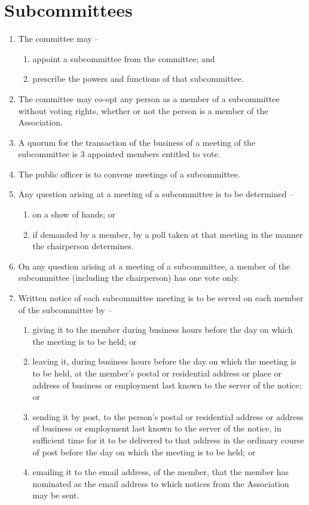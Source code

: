 \section{Subcommittees}
\label{rule:subcommittee}

\begin{enumerate}
	\item The committee may --
	\begin{enumerate}
		\item appoint a subcommittee from the committee; and
		\item prescribe the powers and functions of that subcommittee.
	\end{enumerate}
	
	\item The committee may co-opt any person as a member of a subcommittee without voting rights, whether or not the person is a member of the Association.
	\item A quorum for the transaction of the business of a meeting of the subcommittee is 3 appointed members entitled to vote.
	\item The public officer is to convene meetings of a subcommittee.
	
	\item Any question arising at a meeting of a subcommittee is to be determined --
	\begin{enumerate}
		\item on a show of hands; or
		\item if demanded by a member, by a poll taken at that meeting in the manner the chairperson determines.
	\end{enumerate}
	
	\item On any question arising at a meeting of a subcommittee, a member of the subcommittee (including the chairperson) has one vote only.
	
	\item Written notice of each subcommittee meeting is to be served on each member of the subcommittee by --
	\begin{enumerate}
		\item giving it to the member during business hours before the day on which the meeting is to be held; or
		\item leaving it, during business hours before the day on which the meeting is to be held, at the member's postal or residential address or place or address of business or employment last known to the server of the notice; or
		\item sending it by post, to the person's postal or residential address or address of business or employment last known to the server of the notice, in sufficient time for it to be delivered to that address in the ordinary course of post before the day on which the meeting is to be held; or
		\item emailing it to the email address, of the member, that the member has nominated as the email address to which notices from the Association may be sent.
	\end{enumerate}
\end{enumerate}